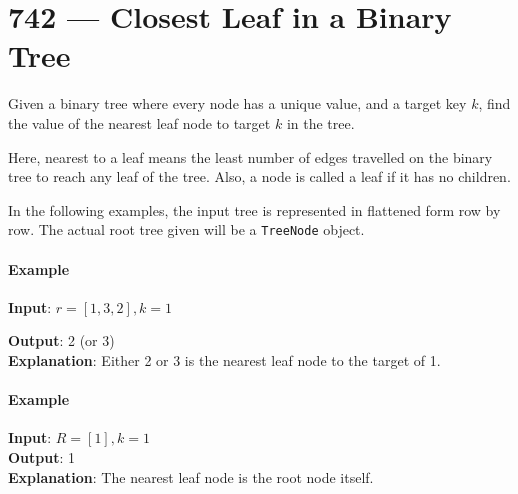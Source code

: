 \section{742 --- Closest Leaf in a Binary Tree}
Given a binary tree where every node has a unique value, and a target key $k$, find the value of the nearest leaf node to target $k$ in the tree.
\par
Here, nearest to a leaf means the least number of edges travelled on the binary tree to reach any leaf of the tree. Also, a node is called a leaf if it has no children.
\par
In the following examples, the input tree is represented in flattened form row by row. The actual root tree given will be a \texttt{TreeNode} object.
\paragraph*{Example}
\begin{flushleft}
\textbf{Input}: $r=[1,3,2], k=1$
\begin{figure}[H]
\end{figure}
\textbf{Output}: 2 (or 3)
\\
\textbf{Explanation}: Either 2 or 3 is the nearest leaf node to the target of 1.
\end{flushleft}
\paragraph*{Example}
\begin{flushleft}
\textbf{Input}: $R = [1], k=1$
\\
\textbf{Output}: 1
\\
\textbf{Explanation}: The nearest leaf node is the root node itself.
\end{flushleft}
